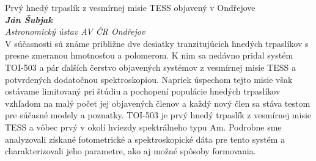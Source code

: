 \documentclass[a4paper]{report}
\begin{document}
                    \begin{tcolorbox}[
                                    colback=white,
                    colframe=black!70!white,
                                fonttitle=\Large\bfseries,
                title=17:00
            ]
                {\Large Prvý hnedý trpaslík z vesmírnej misie TESS objavený v Ondřejove}
                                                            \\ \textbf{\textit{Ján Šubjak}}
                                                    \\ \textit{Astronomický ústav AV ČR Ondřejov}                \\[2ex]V súčasnosti sú známe približne dve desiatky tranzitujúcich hnedých trpaslíkov s presne zmeranou hmotnosťou a polomerom. K nim sa nedávno pridal systém TOI-503 a pár ďalších čerstvo objavených systémov z vesmírnej misie TESS a potvrdených dodatočnou spektroskopiou. Napriek úspechom tejto misie však ostávame limitovaný pri štúdiu a pochopení populácie hnedých trpaslíkov vzhľadom na malý počet jej objavených členov a každý nový člen sa stáva testom pre súčasné modely a poznatky. TOI-503 je prvý hnedý trpaslík z vesmírnej misie TESS a vôbec prvý v okolí hviezdy spektrálneho typu Am. Podrobne sme analyzovali získané fotometrické a spektroskopické dáta pre tento systém a charakterizovali jeho parametre, ako aj možné spôsoby formovania.
            \end{tcolorbox}
\end{document}
